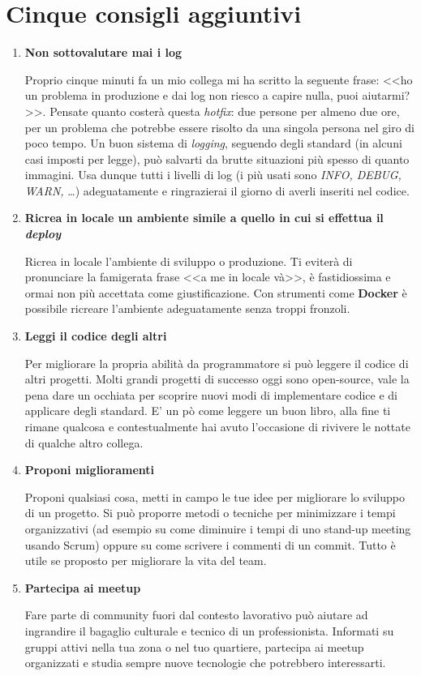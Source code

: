 \section{Cinque consigli aggiuntivi}

\begin{enumerate}

\item \textbf{Non sottovalutare mai i log}

Proprio cinque minuti fa un mio collega mi ha scritto la seguente frase: <<ho un problema in produzione e dai log non riesco a capire nulla, puoi aiutarmi?>>.
Pensate quanto costerà questa \emph{hotfix}: due persone per almeno due ore, per un problema che potrebbe essere risolto da una singola persona nel giro di poco tempo. Un buon sistema di \emph{logging}, seguendo degli standard (in alcuni casi imposti per legge), può salvarti da brutte situazioni più spesso di quanto immagini. Usa dunque tutti i livelli di log (i più usati sono \emph{INFO, DEBUG, WARN,} \dots) adeguatamente e ringrazierai il giorno di averli inseriti nel codice. 

\item \textbf{Ricrea in locale un ambiente simile a quello in cui si effettua il \emph{deploy}}

Ricrea in locale l'ambiente di sviluppo o produzione. Ti eviterà di pronunciare la famigerata frase <<a me in locale và>>, è fastidiossima e ormai non più accettata come giustificazione. Con strumenti come \textbf{Docker} è possibile ricreare l'ambiente adeguatamente senza troppi fronzoli.

\item \textbf{Leggi il codice degli altri}

Per migliorare la propria abilità da programmatore si può leggere il codice di altri progetti. Molti grandi progetti di successo oggi sono open-source, vale la pena dare un occhiata per scoprire nuovi modi di implementare codice e di applicare degli standard. E' un pò come leggere un buon libro, alla fine ti rimane qualcosa e contestualmente hai avuto l'occasione di rivivere le nottate di qualche altro collega.


\item \textbf{Proponi miglioramenti}

Proponi qualsiasi cosa, metti in campo le tue idee per migliorare lo sviluppo di un progetto. Si può proporre metodi o tecniche per minimizzare i tempi organizzativi (ad esempio su come diminuire i tempi di uno stand-up meeting usando Scrum) oppure su come scrivere i commenti di un commit. Tutto è utile se proposto per migliorare la vita del team.

\item \textbf{Partecipa ai meetup}

Fare parte di community fuori dal contesto lavorativo può aiutare ad ingrandire il bagaglio culturale e tecnico di un professionista. Informati su gruppi attivi nella tua zona o nel tuo quartiere, partecipa ai meetup organizzati e studia sempre nuove tecnologie che potrebbero interessarti.


\end{enumerate}